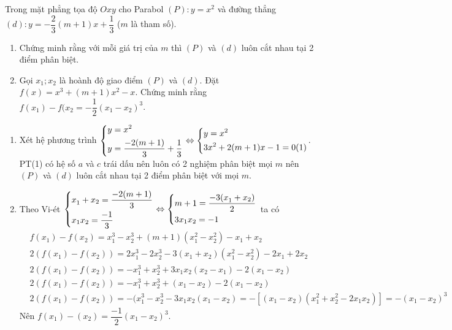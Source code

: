 \begin{ex}%
	Trong mặt  phẳng tọa độ $Oxy$ cho Parabol $(P): y=x^2$  và đường thẳng  $(d): y=-\dfrac{2}{3}(m+1)x+\dfrac{1}{3}$ ($m$ là tham số).
        \begin{enumerate}
        \item Chứng minh rằng với mỗi giá trị  của $m$ thì $(P)$ và $(d)$ luôn cắt nhau tại 2 điểm phân biệt.
        \item Gọi ${{x}_{1}};{{x}_{2}}$ là hoành độ giao điểm $(P)$ và $(d)$. Đặt $f(x)={{x}}^{3}+(m+1){{x}}^{2}-x$. Chứng minh rằng $f({{x}}_{1})-f({{x}}_{2}=-\dfrac{1}{2}({{x}}_{1}-{{x}}_{2})^{3}$.
        
    \end{enumerate}
\loigiai
    {
    \begin{enumerate}
        \item Xét hệ phương trình  $\left\{\begin{aligned}
        	& y={{x}^{2}} \\ 
        	& y=\dfrac{-2(m+1)}{3}+\dfrac{1}{3}\end{aligned}\right.\Leftrightarrow \left\{\begin{aligned}
        	& y={{x}^{2}} \\ 
        	& 3{{x}^{2}}+2(m+1)x-1=0(1)\end{aligned}\right.$.\\
        PT(1) có hệ số $a$ và $c$ trái dấu nên luôn có 2 nghiệm phân biệt mọi $m$ nên $(P)$ và 
        $(d)$ luôn cắt nhau tại 2 điểm phân biệt với mọi $m$.
        \item Theo Vi-ét  $\left\{\begin{aligned}
        	&x_{1}^{{}}+{{x}_{2}}=\dfrac{-2(m+1)}{3}\\&{{x}_{1}}{{x}_{2}}=\dfrac{-1}{3} 
        \end{aligned}\right.\Leftrightarrow \left\{\begin{aligned}
        	& m+1=\dfrac{-3(x_{1}^{{}}+{{x}_{2}})}{2} \\ 
        	& 3{{x}_{1}}{{x}_{2}}=-1
        \end{aligned}\right.$
        ta có 
        \begin{align*}
        & f(x_1)-f(x_2)=x_1^3-x_2^3+(m+1)(x_1^2-x_2^2)-x_1+x_2\\
        & 2\left(f(x_1)-f(x_2)\right)=2x_1^3-2x_2^3-3(x_1+x_2)(x_1^2-x_2^2)-2x_1+2x_2\\
        & 2\left(f(x_1)-f(x_2)\right)=-x_1^3+x_2^3+3x_1x_2(x_2-x_1)-2(x_1-x_2)\\
        & 2\left(f(x_1)-f(x_2)\right)=-x_1^3+x_2^3+(x_1-x_2)-2(x_1-x_2)\\
        & 2\left(f(x_1)-f(x_2)\right)=-(x_1^3-x_2^3-3x_1x_2(x_1-x_2)=-\left[(x_1-x_2)(x_1^2+x_2^2-2x_1x_2)\right]=-(x_1-x_2)^3
        \end{align*}
        Nên $f(x_1)-(x_2)=\dfrac{-1}{2}(x_1-x_2)^3$.         \end{enumerate}
    }
\end{ex}

